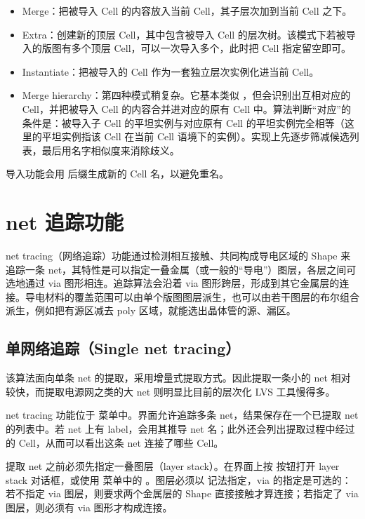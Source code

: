 \begin{itemize}
\item Merge：把被导入 Cell 的内容放入当前 Cell，其子层次加到当前 Cell 之下。
\item Extra：创建新的顶层 Cell，其中包含被导入 Cell 的层次树。该模式下若被导入的版图有多个顶层 Cell，可以一次导入多个，此时把 Cell 指定留空即可。
\item Instantiate：把被导入的 Cell 作为一套独立层次实例化进当前 Cell。
\item Merge hierarchy：第四种模式稍复杂。它基本类似 ，但会识别出互相对应的 Cell，并把被导入 Cell 的内容合并进对应的原有 Cell 中。算法判断“对应”的条件是：被导入子 Cell 的平坦实例与对应原有 Cell 的平坦实例完全相等（这里的平坦实例指该 Cell 在当前 Cell 语境下的实例）。实现上先逐步筛减候选列表，最后用名字相似度来消除歧义。
\end{itemize}

导入功能会用  后缀生成新的 Cell 名，以避免重名。

\section{net 追踪功能}\label{sec:net_tracing}

net tracing（网络追踪）功能通过检测相互接触、共同构成导电区域的 Shape 来追踪一条 net，其特性是可以指定一叠金属（或一般的“导电”）图层，各层之间可选地通过 via 图形相连。追踪算法会沿着 via 图形跨层，形成到其它金属层的连接。导电材料的覆盖范围可以由单个版图图层派生，也可以由若干图层的布尔组合派生，例如把有源区减去 poly 区域，就能选出晶体管的源、漏区。

\subsection{单网络追踪（Single net tracing）}

该算法面向单条 net 的提取，采用增量式提取方式。因此提取一条小的 net 相对较快，而提取电源网之类的大 net 则明显比目前的层次化 LVS 工具慢得多。

net tracing 功能位于  菜单中。界面允许追踪多条 net，结果保存在一个已提取 net 的列表中。若 net 上有 label，会用其推导 net 名；此外还会列出提取过程中经过的 Cell，从而可以看出这条 net 连接了哪些 Cell。

提取 net 之前必须先指定一叠图层（layer stack）。在界面上按  按钮打开 layer stack 对话框，或使用  菜单中的 。图层必须以  记法指定，via 的指定是可选的：若不指定 via 图层，则要求两个金属层的 Shape 直接接触才算连接；若指定了 via 图层，则必须有 via 图形才构成连接。

